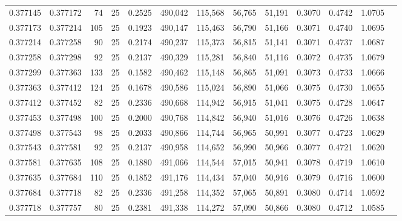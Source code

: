 \begin{tabular}{rrrrrrrrrrrrr}
0.377145 & 0.377172 &    74 &  25 &                                     0.2525 & 490,042 & 115,568 &  56,765 &  51,191 & 0.3070 & 0.4742 & 1.0705 \\
0.377173 & 0.377214 &   105 &  25 &                                     0.1923 & 490,147 & 115,463 &  56,790 &  51,166 & 0.3071 & 0.4740 & 1.0695 \\
0.377214 & 0.377258 &    90 &  25 &                                     0.2174 & 490,237 & 115,373 &  56,815 &  51,141 & 0.3071 & 0.4737 & 1.0687 \\
0.377258 & 0.377298 &    92 &  25 &                                     0.2137 & 490,329 & 115,281 &  56,840 &  51,116 & 0.3072 & 0.4735 & 1.0679 \\
0.377299 & 0.377363 &   133 &  25 &                                     0.1582 & 490,462 & 115,148 &  56,865 &  51,091 & 0.3073 & 0.4733 & 1.0666 \\
0.377363 & 0.377412 &   124 &  25 &                                     0.1678 & 490,586 & 115,024 &  56,890 &  51,066 & 0.3075 & 0.4730 & 1.0655 \\
0.377412 & 0.377452 &    82 &  25 &                                     0.2336 & 490,668 & 114,942 &  56,915 &  51,041 & 0.3075 & 0.4728 & 1.0647 \\
0.377453 & 0.377498 &   100 &  25 &                                     0.2000 & 490,768 & 114,842 &  56,940 &  51,016 & 0.3076 & 0.4726 & 1.0638 \\
0.377498 & 0.377543 &    98 &  25 &                                     0.2033 & 490,866 & 114,744 &  56,965 &  50,991 & 0.3077 & 0.4723 & 1.0629 \\
0.377543 & 0.377581 &    92 &  25 &                                     0.2137 & 490,958 & 114,652 &  56,990 &  50,966 & 0.3077 & 0.4721 & 1.0620 \\
0.377581 & 0.377635 &   108 &  25 &                                     0.1880 & 491,066 & 114,544 &  57,015 &  50,941 & 0.3078 & 0.4719 & 1.0610 \\
0.377635 & 0.377684 &   110 &  25 &                                     0.1852 & 491,176 & 114,434 &  57,040 &  50,916 & 0.3079 & 0.4716 & 1.0600 \\
0.377684 & 0.377718 &    82 &  25 &                                     0.2336 & 491,258 & 114,352 &  57,065 &  50,891 & 0.3080 & 0.4714 & 1.0592 \\
0.377718 & 0.377757 &    80 &  25 &                                     0.2381 & 491,338 & 114,272 &  57,090 &  50,866 & 0.3080 & 0.4712 & 1.0585 \\

\end{tabular}
